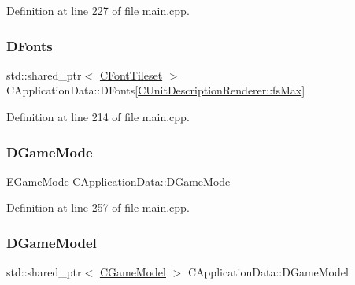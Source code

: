 Definition at line 227 of file main.\+cpp.

\hypertarget{classCApplicationData_afde9247d0a3ea87393ec86dcdb1e8274}{}\label{classCApplicationData_afde9247d0a3ea87393ec86dcdb1e8274} 
\subsubsection{\texorpdfstring{D\+Fonts}{DFonts}}
{\footnotesize\ttfamily std\+::shared\+\_\+ptr$<$ \hyperlink{classCFontTileset}{C\+Font\+Tileset} $>$ C\+Application\+Data\+::\+D\+Fonts\mbox{[}\hyperlink{classCUnitDescriptionRenderer_a3ea4cd83b6dd9533ab3abb953a7da35aa74218e4708bac1eab359099eb0b159b2}{C\+Unit\+Description\+Renderer\+::fs\+Max}\mbox{]}\hspace{0.3cm}{\ttfamily [protected]}}



Definition at line 214 of file main.\+cpp.

\hypertarget{classCApplicationData_a2f906f2b4208ecb2a057e6b62e549685}{}\label{classCApplicationData_a2f906f2b4208ecb2a057e6b62e549685} 
\subsubsection{\texorpdfstring{D\+Game\+Mode}{DGameMode}}
{\footnotesize\ttfamily \hyperlink{classCApplicationData_ac8ac37a4c8bb871036fbbdc6a072e403}{E\+Game\+Mode} C\+Application\+Data\+::\+D\+Game\+Mode\hspace{0.3cm}{\ttfamily [protected]}}



Definition at line 257 of file main.\+cpp.

\hypertarget{classCApplicationData_a32b50c7c1cbac3cfd67c7f775b1d6fee}{}\label{classCApplicationData_a32b50c7c1cbac3cfd67c7f775b1d6fee} 
\subsubsection{\texorpdfstring{D\+Game\+Model}{DGameModel}}
{\footnotesize\ttfamily std\+::shared\+\_\+ptr$<$ \hyperlink{classCGameModel}{C\+Game\+Model} $>$ C\+Application\+Data\+::\+D\+Game\+Model\hspace{0.3cm}{\ttfamily [protected]}}



